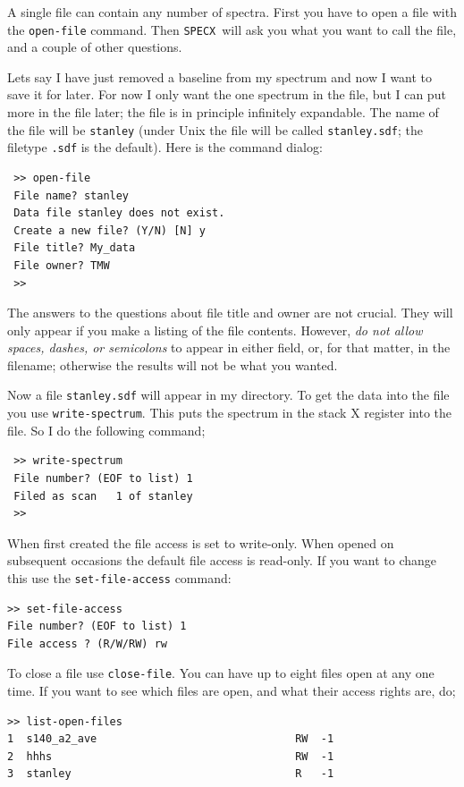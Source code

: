 \documentclass[11pt,twoside]{article}
\newcommand{\SPECX}{{\tt SPECX}}
\begin{document}
A single file can contain any number of spectra.  First you have to
open a file with the {\tt open-file} command.  Then \SPECX\ will ask
you what you want to call the file, and a couple of other questions.

Lets say I have just removed a baseline from my spectrum and now I
want to save it for later.  For now I only want the one spectrum in the
file, but I can put more in the file later; the file is in principle
infinitely expandable. The name of the file will be {\tt stanley}
(under Unix the file will be called {\tt stanley.sdf}; the filetype
{\tt .sdf} is the default). Here is the command dialog:

\begin{verbatim}
 >> open-file
 File name? stanley
 Data file stanley does not exist.
 Create a new file? (Y/N) [N] y
 File title? My_data
 File owner? TMW
 >>
\end{verbatim}

The answers to the questions about file title and owner are not crucial.
They will only appear if you make a listing of the file contents. However,
{\it do not allow spaces, dashes, or semicolons} to appear in either
field, or, for that matter, in the filename; otherwise the results will
not be what you wanted. 

Now a file {\tt stanley.sdf} will appear in my directory.  To get the
data into the file you use {\tt write-spectrum}.  This puts the
spectrum in the stack X register into the file.  So I do the following
command;

\begin{verbatim}
 >> write-spectrum 
 File number? (EOF to list) 1
 Filed as scan   1 of stanley
 >> 
\end{verbatim}

When first created the file access is set to write-only. When opened on 
subsequent occasions the default file access is read-only. If you want to 
change this use the {\tt set-file-access} command:

\begin{verbatim}
>> set-file-access
File number? (EOF to list) 1
File access ? (R/W/RW) rw
\end{verbatim}

To close a file use {\tt close-file}.  You can have up to eight files open
at any one time.  If you want to see which files are open, and what their
access rights are, do;

\begin{verbatim}
>> list-open-files
1  s140_a2_ave                               RW  -1
2  hhhs                                      RW  -1
3  stanley                                   R   -1
\end{verbatim}
\end{document}
